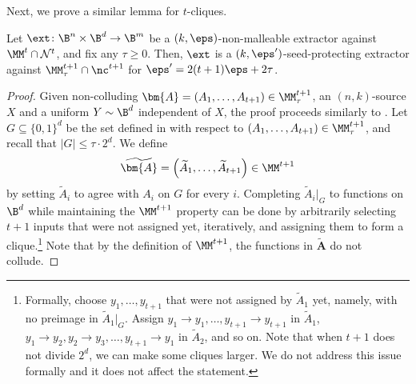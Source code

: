 \documentclass{toc}
\begin{document}
Next, we prove a similar lemma for $t$-cliques. 
\begin{lemma}\label{lem:nm-to-sp2}
Let $\ext \colon \B^{n} \times \B^{d} \rightarrow \B^{m}$ be a $(k,\eps)$-non-malleable extractor
against $\MM^t \cap \mathcal{N}^{t}$, and fix any $\tau \ge 0$. Then, $\ext$ is a $(k,\eps')$-seed-protecting extractor against $\MM^{t+1}_{\tau} \cap \nc^{t+1}$ for
$\eps' = 2(t+1)\eps + 2\tau$. 
\end{lemma}
\begin{proof}
Given %
non-colluding  %
$\bm{A} = \left(A_1,\ldots,A_{t+1} \right) \in \MM_{\tau}^{t+1}$,
an $(n,k)$-source $X$ and a uniform $Y \sim \B^d$ independent of $X$,
the proof proceeds similarly to . Let $G \subseteq \{0,1\}^d$ be the set defined in  with respect to $(A_1,\ldots,A_{t+1}) \in \MM^{t+1}_{\tau}$, and recall that $|G| \le \tau \cdot 2^d$.
We define 
%
%
\[\widetilde{\bm{A}} = \left(\widetilde{A}_1,\ldots,\widetilde{A}_{t+1}\right) \in \MM^{t+1}\]
by setting $\widetilde{A}_i$ to agree with $A_i$ on $G$ for every $i$.
%
Completing $\widetilde{A}_i|_{G}$ to functions on $\B^d$ while maintaining the $\MM^{t+1}$ property can
be done by arbitrarily selecting $t+1$ inputs that were not assigned yet, iteratively, and assigning them
to form a clique.\footnote{Formally, choose $y_1,\ldots,y_{t+1}$ that
were not assigned by $\widetilde{A}_1$ yet, namely, with no preimage in $\widetilde{A}_1|_G$. 
Assign $y_1 \rightarrow y_1,\ldots,y_{t+1} \rightarrow y_{t+1}$ in $\widetilde{A}_1$, 
$y_1 \rightarrow y_2,y_2 \rightarrow y_3,\ldots,y_{t+1}\rightarrow y_{1}$ in $\widetilde{A}_2$,
and so on. Note that when $t+1$ does not divide $2^d$, we can make some cliques larger. We do not address this issue formally and it does not affect the statement.}
Note that by the definition of $\MM^{t+1}$, the functions in $\widetilde{\bm{A}}$ do not collude.  



\end{proof}
\end{document}
